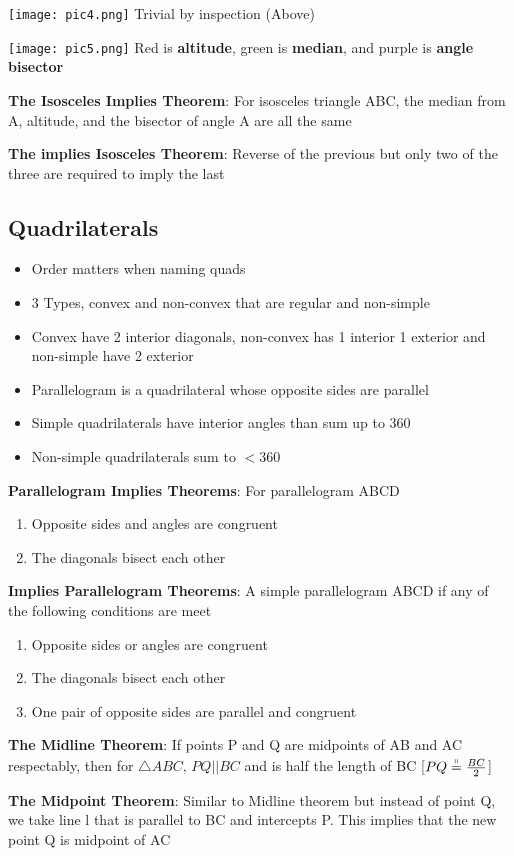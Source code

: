 \documentclass[11pt]{article}
\begin{document}
\noindent\texttt{[image: pic4.png]}
\noindent Trivial by inspection (Above)


\noindent\texttt{[image: pic5.png]}
\noindent Red is \textbf{altitude}, green is \textbf{median}, and purple is \textbf{angle bisector}

\noindent\textbf{The Isosceles Implies Theorem}: For isosceles triangle ABC, the median from A, altitude, and the bisector of angle A are all the same

\noindent\textbf{The implies Isosceles Theorem}: Reverse of the previous but only two of the three are required to imply the last

\subsection{Quadrilaterals}
\begin{itemize}
  \item Order matters when naming quads
  \item 3 Types, convex and non-convex that are regular and non-simple
  \item Convex have 2 interior diagonals, non-convex has 1 interior 1 exterior and non-simple have 2 exterior
  \item Parallelogram is a quadrilateral whose opposite sides are parallel
  \item Simple quadrilaterals have interior angles than sum up to 360
  \item Non-simple quadrilaterals sum to $< 360$
\end{itemize}

\noindent \textbf{Parallelogram Implies Theorems}: For parallelogram ABCD
\begin{enumerate}
    \item Opposite sides and angles are congruent
    \item The diagonals bisect each other 
\end{enumerate}

\noindent \textbf{Implies Parallelogram Theorems}: A simple parallelogram ABCD if any of the following conditions are meet
\begin{enumerate}
    \item Opposite sides or angles are congruent
    \item The diagonals bisect each other 
    \item One pair of opposite sides are parallel and congruent
\end{enumerate}

\noindent \textbf{The Midline Theorem}: If points P and Q are midpoints of AB and AC respectably, then for $\triangle ABC$, $PQ||BC$ and is half the length of BC [$PQ\overset{\shortparallel}{=}\frac{BC}{2}$]

\noindent \textbf{The Midpoint Theorem}: Similar to Midline theorem but instead of point Q, we take line l that is parallel to BC and intercepts P. This implies that the new point Q is midpoint of AC
\end{document}

